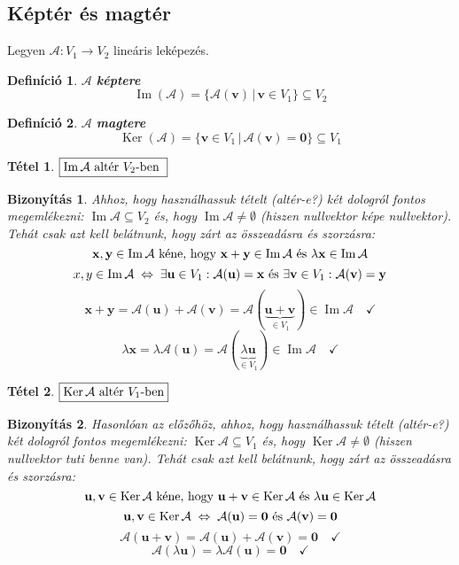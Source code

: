 \documentclass[a4paper,12pt,twoside]{book}
\newcommand{\vek}[1]{\mathbf{#1}} %
\DeclareMathOperator{\Ker}{Ker}
\DeclareMathOperator{\Ima}{Im}
\newtheorem{defi}{Definíció}[chapter]
\newtheorem{tetel}{Tétel}[chapter]
\newtheorem{biz}{Bizonyítás}[chapter]
\theoremstyle{break}
\begin{document}
\subsection{Képtér és magtér}

Legyen $\mathcal{A}: V_1 \to V_2$ lineáris leképezés.

\begin{defi} $\mathcal{A}$ \textbf{képtere}
 \[\Ima(\mathcal{A}) = \{\mathcal{A}(\vek{v}) \,|\, \vek{v}\in V_1\}\subseteq V_2\]
\end{defi}

\begin{defi} $\mathcal{A}$ \textbf{magtere}
 \[\Ker(\mathcal{A}) = \{\vek{v}\in V_1 \,|\, \mathcal{A}(\vek{v}) = \vek{0}\}\subseteq V_1\]
\end{defi}

\begin{tetel} $\boxed{\Ima \mathcal{A}$ altér $V_2$-ben $}$ \end{tetel}
\begin{biz}
 Ahhoz, hogy használhassuk  tételt (altér-e?) két dologról fontos megemlékezni: $\Ima \mathcal{A}\subseteq V_2$ és, hogy $\Ima \mathcal{A}\neq \emptyset$ (hiszen nullvektor képe nullvektor). Tehát csak azt kell belátnunk, hogy zárt az összeadásra és szorzásra:
 \[\vek{x}, \vek{y} \in \Ima \mathcal{A} \hbox{ kéne, hogy } \vek{x}+\vek{y} \in \Ima \mathcal{A} \hbox{ és } \lambda \vek{x} \in \Ima \mathcal{A}\]
 \[x, y \in \Ima \mathcal{A} \; \Leftrightarrow \; \exists \vek{u}\in V_1 : \mathcal{A}(\vek{u})=\vek{x} \hbox{ és } \exists \vek{v}\in V_1 : \mathcal{A}(\vek{v})=\vek{y}\]
 \[\vek{x}+\vek{y} = \mathcal{A}(\vek{u}) +\mathcal{A}(\vek{v}) = \mathcal{A}(\underbrace{\vek{u} +\vek{v}}_{\in V_1}) \in \Ima \mathcal{A} \quad \checkmark\]
 \[\lambda \vek{x} = \lambda \mathcal{A}(\vek{u}) = \mathcal{A}(\underbrace{\lambda\vek{u}}_{\in V_1}) \in \Ima \mathcal{A} \quad \checkmark\]
\end{biz}

\begin{tetel} $\boxed{\Ker \mathcal{A}$ altér $V_1$-ben$}$ \end{tetel}
\begin{biz}
 Hasonlóan az előzőhöz, ahhoz, hogy használhassuk  tételt (altér-e?) két dologról fontos megemlékezni: $\Ker \mathcal{A}\subseteq V_1$ és, hogy $\Ker \mathcal{A}\neq \emptyset$ (hiszen nullvektor tuti benne van). Tehát csak azt kell belátnunk, hogy zárt az összeadásra és szorzásra:
 \[\vek{u}, \vek{v} \in \Ker \mathcal{A} \hbox{ kéne, hogy } \vek{u}+\vek{v} \in \Ker \mathcal{A} \hbox{ és } \lambda \vek{u} \in \Ker \mathcal{A}\]
 \[\vek{u}, \vek{v} \in \Ker \mathcal{A} \; \Leftrightarrow \; \mathcal{A}(\vek{u}) = \vek{0} \hbox{ és } \mathcal{A}(\vek{v}) = \vek{0}\]
 \[\mathcal{A}(\vek{u}+\vek{v}) = \mathcal{A}(\vek{u}) + \mathcal{A}(\vek{v}) = \vek{0} \quad \checkmark\]
 \[\mathcal{A}(\lambda\vek{u}) = \lambda \mathcal{A}(\vek{u}) = \vek{0} \quad \checkmark\]
\end{biz}
\end{document}

